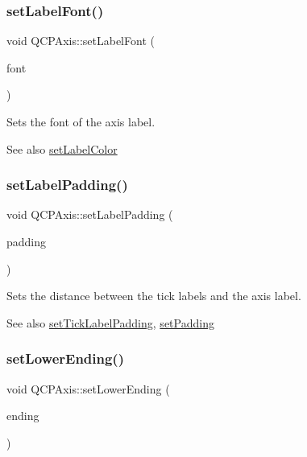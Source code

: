 \subsubsection{\texorpdfstring{set\+Label\+Font()}{setLabelFont()}}
{\footnotesize\ttfamily void Q\+C\+P\+Axis\+::set\+Label\+Font (\begin{DoxyParamCaption}\item[{const Q\+Font \&}]{font }\end{DoxyParamCaption})}

Sets the font of the axis label.

\begin{DoxySeeAlso}{See also}
\hyperlink{class_q_c_p_axis_a6c906fe56d75f0122335b9f79b999608}{set\+Label\+Color} 
\end{DoxySeeAlso}
\mbox{\label{class_q_c_p_axis_a4391192a766e5d20cfe5cbc17607a7a2}} 
\subsubsection{\texorpdfstring{set\+Label\+Padding()}{setLabelPadding()}}
{\footnotesize\ttfamily void Q\+C\+P\+Axis\+::set\+Label\+Padding (\begin{DoxyParamCaption}\item[{int}]{padding }\end{DoxyParamCaption})}

Sets the distance between the tick labels and the axis label.

\begin{DoxySeeAlso}{See also}
\hyperlink{class_q_c_p_axis_af302c479af9dbc2e9f0e44e07c0012ee}{set\+Tick\+Label\+Padding}, \hyperlink{class_q_c_p_axis_a5691441cb3de9e9844855d339c0db279}{set\+Padding} 
\end{DoxySeeAlso}
\mbox{\label{class_q_c_p_axis_a08af1c72db9ae4dc8cb8a973d44405ab}} 
\subsubsection{\texorpdfstring{set\+Lower\+Ending()}{setLowerEnding()}}
{\footnotesize\ttfamily void Q\+C\+P\+Axis\+::set\+Lower\+Ending (\begin{DoxyParamCaption}\item[{const \hyperlink{class_q_c_p_line_ending}{Q\+C\+P\+Line\+Ending} \&}]{ending }\end{DoxyParamCaption})}

